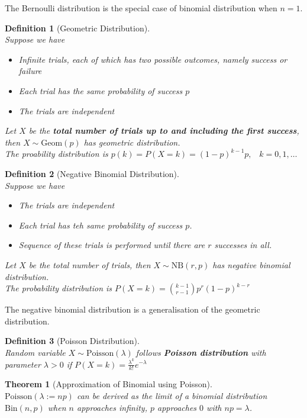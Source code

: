 \documentclass[12pt]{article}
\newcommand{\bin}{\mathrm{Bin}}
\newcommand{\geom}{\mathrm{Geom}}
\newcommand{\Poi}{\mathrm{Poisson}}
\newcommand{\nb}{\mathrm{NB}}
\newtheorem{definition}{Definition}[section]
\newtheorem{theorem}{Theorem}[section]
\theoremstyle{definition}
\begin{document}
The Bernoulli distribution is the special case of binomial distribution when $n=1$.
\begin{definition}[Geometric Distribution]
\hfill\\\normalfont Suppose we have
\begin{itemize}
  \item Infinite trials, each of which has two possible outcomes, namely success or failure
  \item Each trial has the same probability of success $p$
  \item The trials are independent
\end{itemize}
Let $X$ be the \textbf{total number of trials up to and including the first success}, then $X\sim\geom(p)$ has geometric distribution.\\
The proability distribution is
$
p(k) = P(X=k)=(1-p)^{k-1}p, \;\;\; k=0,1,\ldots
$
\end{definition}
\begin{definition}[Negative Binomial Distribution]
\hfill\\\normalfont Suppose we have
\begin{itemize}
  \item The trials are independent
  \item Each trial has teh same probability of success $p$.
  \item Sequence of these trials is performed until there are $r$ successes in all.
\end{itemize}
Let $X$ be the total number of trials, then $X\sim \nb(r,p)$ has negative binomial distribution.\\
The probability distribution is
$
P(X=k) = \binom{k-1}{r-1}p^r(1-p)^{k-r}
$
\end{definition}
The negative binomial distribution is a generalisation of the geometric distribution.
\begin{definition}[Poisson Distribution]
\hfill\\\normalfont Random variable $X\sim\Poi(\lambda)$ follows \textbf{Poisson distribution} with parameter $\lambda>0$ if
$
P(X=k) = \frac{\lambda^k}{k!}e^{-\lambda}
$
\end{definition}
\begin{theorem}[Approximation of Binomial using Poisson]
\hfill\\\normalfont $\Poi(\lambda :=np)$ can be derived as the limit of a binomial distribution $\bin(n,p)$ when $n$ approaches infinity, $p$ approaches $0$ with $np = \lambda$.
\end{theorem}
\end{document}
